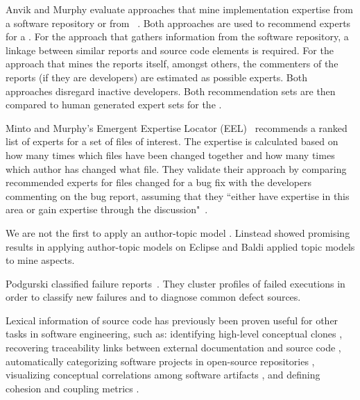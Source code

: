 Anvik and Murphy evaluate approaches that mine implementation expertise from a software repository or from \BRs~\cite{Anvik07}. Both approaches are used to recommend experts for a \BR. For the approach that gathers information from the software repository, a linkage between similar reports and source code elements is required. For the approach that mines the reports itself, amongst others, the commenters of the reports (if they are developers) are estimated as possible experts. Both approaches disregard inactive developers. Both recommendation sets are then compared to human generated expert sets for the \BR.

Minto and Murphy's Emergent Expertise Locator (EEL)~\cite{Minto07} recommends a ranked list of experts for a set of files of interest. The expertise is calculated based on how many times which files have been changed together and how many times which author has changed what file. They validate their approach by comparing recommended experts for files changed for a bug fix with the developers commenting on the bug report, assuming that they ``either have expertise in this area or gain expertise through the discussion"~\cite{Minto07}.


We are not the first to apply an author-topic model \cite{Linstead07, Bald08a}. Linstead \etal showed promising results in applying author-topic models on Eclipse and Baldi \etal applied topic models to mine aspects.

Podgurski \etal classified failure reports~\cite{Podgurski03}. They cluster profiles of failed executions in order to classify new failures and to diagnose common defect sources.

Lexical information of source code has previously been proven useful for other tasks in software engineering, such as: identifying high-level conceptual clones \cite{Marc01a}, recovering traceability links between external documentation and source code \cite{Anto02a}, automatically categorizing software projects in open-source repositories \cite{Kawa04a}, visualizing conceptual correlations among software artifacts \cite{Kuhn07a,Kuhn08b}, and defining cohesion and coupling metrics \cite{Marc05a,Posh09a}.

